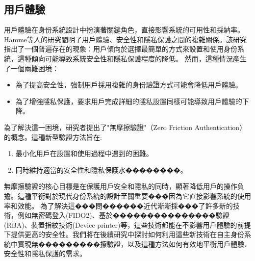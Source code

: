 \subsection{用戶體驗}
用戶體驗在身份系統設計中扮演著關鍵角色，直接影響系統的可用性和採納率。Hamme等人\cite{inproceedings}的研究闡明了用戶體驗、安全性和隱私保護之間的複雜關係。該研究指出了一個普遍存在的現象：用戶傾向於選擇最簡單的方式來設置和使用身份系統，這種傾向可能導致系統安全性和隱私保護程度的降低。\newline
然而，這種情況產生了一個兩難困境：
\begin{itemize}
  \item 為了提高安全性，強制用戶採用複雜的身份驗證方式可能會降低用戶體驗。
  \item 為了增強隱私保護，要求用戶完成詳細的隱私設置同樣可能導致用戶體驗的下降。
\end{itemize}
為了解決這一困境，研究者提出了"無摩擦驗證"（Zero Friction Authentication）的概念。這種新型驗證方法旨在:
\begin{enumerate}
  \item 最小化用戶在設置和使用過程中遇到的困難。
  \item 同時維持適當的安全性和隱私保護水��������。
\end{enumerate}
無摩擦驗證的核心目標是在保護用戶安全和隱私的同時，顯著降低用戶的操作負擔。這種平衡對於現代身份系統的設計至關重要���因為它直接影響系統的使用率和效能。\newline
為了解決這���問������近代漸漸採���了許多新的技術，例如無密碼登入(FIDO2)、基於���������������驗證(RBA)、裝置指紋技術(Device printer)等，這些技術都能在不影響用戶體驗的前提下提供更高的安全性。我們將在後續研究中探討如何利用這些新技術在自主身份系統中實現無���������擦驗證，以及這種方法如何有效地平衡用戶體驗、安全性和隱私保護的需求。
